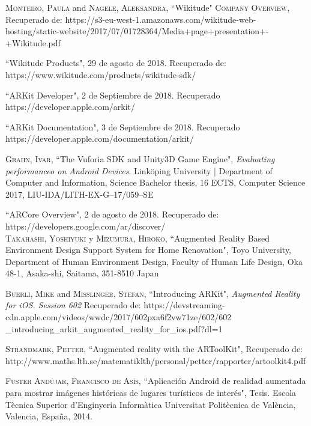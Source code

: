 \begin{thebibliography}{X}
	 \textsc{Monteiro, Paula} and \textsc{Nagele, Aleksandra}, ``Wikitude" \textsc{Company Overview}, Recuperado de: https://s3-eu-west-1.amazonaws.com/wikitude-web-hosting/static-website/2017/07/01728364/Media+page+presentation+-+Wikitude.pdf
	
	
	
	 ``Wikitude Products", 29 de agosto de 2018. Recuperado de: https://www.wikitude.com/products/wikitude-sdk/
	
	
	 ``ARKit Developer", 2 de Septiembre de 2018. Recuperado
	https://developer.apple.com/arkit/
	
	 ``ARKit Documentation", 3 de Septiembre de 2018. Recuperado
	https://developer.apple.com/documentation/arkit/
	
	
	 \textsc{Grahn, Ivar}, ``The Vuforia SDK and Unity3D Game Engine", \textit{Evaluating performanceo on Android Devices}. Linköping University | Department of Computer and Information, Science Bachelor thesis, 16 ECTS, Computer Science 2017, LIU-IDA/LITH-EX-G–17/059–SE
	
	
	 ``ARCore Overview", 2 de agosto de 2018. Recuperado de: https://developers.google.com/ar/discover/
	\\
	
	
	
	 \textsc{Takahashi, Yoshiyuki} y \textsc{Mizumura, Hiroko},
	``Augmented Reality Based Environment Design Support System for Home Renovation", Toyo  University, Department of Human Environment Design, Faculty of Human Life Design, Oka 48-1, Asaka-shi, Saitama, 351-8510 Japan 
	
	
	
	 \textsc{Buerli, Mike} and \textsc{Misslinger, Stefan}, ``Introducing ARKit", \textit{Augmented Reality for iOS. Session 602} Recuperado de: https://devstreaming-cdn.apple.com/videos/wwdc/2017/602pxa6f2vw71ze/602/602
	\_introducing\_arkit\_augmented\_reality\_for\_ios.pdf?dl=1
	
	 \textsc{Strandmark, Petter}, ``Augmented reality with the ARToolKit", Recuperado de: http://www.maths.lth.se/matematiklth/personal/petter/rapporter/artoolkit4.pdf
	
	 \textsc{Fuster Andújar, Francisco de Asís}, ``Aplicación Android de realidad aumentada para mostrar imágenes históricas de lugares turísticos de interés", Tesis. Escola Tècnica Superior d’Enginyeria Informàtica Universitat Politècnica de València, Valencia, España, 2014.
	

\end{thebibliography}
